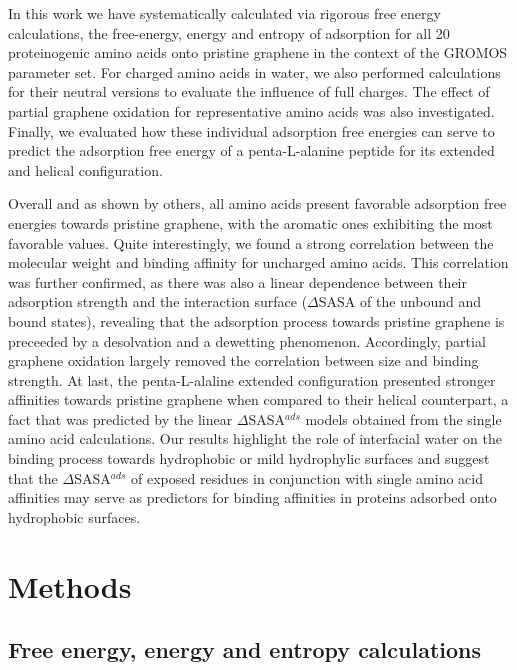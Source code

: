 \documentclass[journal=jcisd8,manuscript=article,layout=twocolumn]{achemso}
\begin{document}
In this work we have systematically calculated via rigorous free energy calculations, the free-energy, energy and entropy of adsorption for all 20 proteinogenic amino acids onto pristine graphene in the context of the GROMOS parameter set.\cite{Oostenbrink_2005}
For charged amino acids in water, we also performed calculations for their neutral versions to evaluate the influence of full charges.
The effect of partial graphene oxidation for representative amino acids was also investigated.
Finally, we evaluated how these individual adsorption free energies can serve to predict the adsorption free energy of a penta-L-alanine peptide for its extended and helical configuration.

Overall and as shown by others, \cite{Hughes2015,Welch2015,Dasetty2019} all amino acids present favorable adsorption free energies towards pristine graphene, with the aromatic ones exhibiting the most favorable values.
Quite interestingly, we found a strong correlation between the molecular weight and binding affinity for uncharged amino acids.
This correlation was further confirmed, as there was also a linear dependence between their adsorption strength and the interaction surface ($\Delta$SASA of the unbound and bound states), revealing that the adsorption process towards pristine graphene is preceeded by a desolvation and a dewetting phenomenon.
Accordingly, partial graphene oxidation largely removed the correlation between size and binding strength.
At last, the penta-L-alaline extended configuration presented stronger affinities towards pristine graphene when compared to their helical counterpart, a fact that was predicted by the linear $\Delta$SASA$^{ads}$ models obtained from the single amino acid calculations.
Our results highlight the role of interfacial water on the binding process towards hydrophobic or mild hydrophylic surfaces and suggest that the $\Delta$SASA$^{ads}$ of exposed residues in conjunction with single amino acid affinities may serve as predictors for binding affinities in proteins adsorbed onto hydrophobic surfaces.

\section{Methods}

\subsection{Free energy, energy and entropy calculations}
\end{document}
